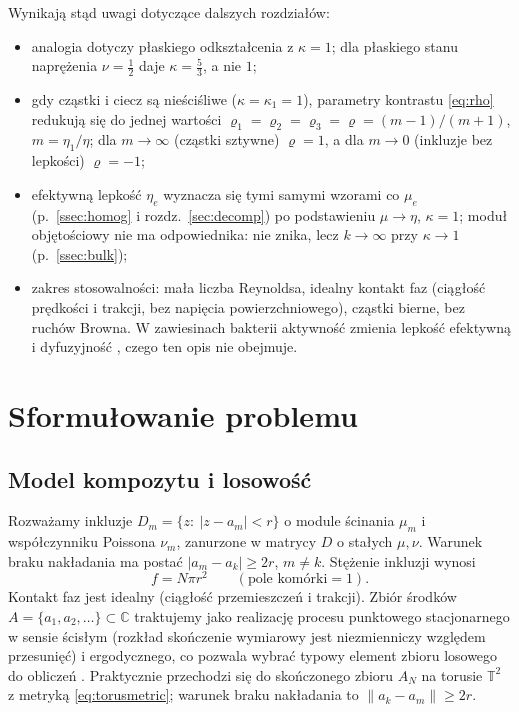 \documentclass[12pt,a4paper,twoside,openright]{report}
\theoremstyle{definition}
\theoremstyle{remark}
\newcommand{\C}{\mathbb{C}}
\newcommand{\T}{\mathbb{T}}
\begin{document}
Wynikają stąd uwagi dotyczące dalszych rozdziałów:
\begin{itemize}[nosep]
\item analogia dotyczy płaskiego odkształcenia z $\kappa=1$; dla płaskiego stanu naprężenia $\nu=\tfrac12$ daje $\kappa=\tfrac53$, a nie $1$;
\item gdy cząstki i ciecz są nieściśliwe ($\kappa=\kappa_1=1$), parametry kontrastu \eqref{eq:rho} redukują się do jednej wartości $\varrho_1=\varrho_2=\varrho_3=\varrho=(m-1)/(m+1)$, $m=\eta_1/\eta$; dla $m\to\infty$ (cząstki sztywne) $\varrho=1$, a dla $m\to0$ (inkluzje bez lepkości) $\varrho=-1$;
\item efektywną lepkość $\eta_e$ wyznacza się tymi samymi wzorami co $\mu_e$ (p.~\ref{ssec:homog} i rozdz.~\ref{sec:decomp}) po podstawieniu $\mu\to\eta$, $\kappa=1$; moduł objętościowy nie ma odpowiednika: nie znika, lecz $k\to\infty$ przy $\kappa\to1$ (p.~\ref{ssec:bulk});
\item zakres stosowalności: mała liczba Reynoldsa, idealny kontakt faz (ciągłość prędkości i trakcji, bez napięcia powierzchniowego), cząstki bierne, bez ruchów Browna. W zawiesinach bakterii aktywność zmienia lepkość efektywną i dyfuzyjność \cite{aranson2022bacterial}, czego ten opis nie obejmuje.
\end{itemize}


\chapter{Sformułowanie problemu}\label{sec:model}

\section{Model kompozytu i losowość}\label{ssec:modellos}

Rozważamy inkluzje $D_m=\{z:\ |z-a_m|<r\}$ o module ścinania $\mu_m$ i współczynniku Poissona $\nu_m$, zanurzone w matrycy $D$ o stałych $\mu,\nu$. Warunek braku nakładania ma postać $|a_m-a_k|\ge 2r$, $m\ne k$. Stężenie inkluzji wynosi
\begin{equation}
f=N\pi r^2\qquad(\text{pole komórki}=1).
\end{equation}
Kontakt faz jest idealny (ciągłość przemieszczeń i trakcji). Zbiór środków $A=\{a_1,a_2,\dots\}\subset\C$ traktujemy jako realizację procesu punktowego stacjonarnego w sensie ścisłym (rozkład skończenie wymiarowy jest niezmienniczy względem przesunięć) i ergodycznego, co pozwala wybrać typowy element zbioru losowego do obliczeń \cite{czapla2025computational}. Praktycznie przechodzi się do skończonego zbioru $A_N$ na torusie $\T^2$ z metryką \eqref{eq:torusmetric}; warunek braku nakładania to $\|a_k-a_m\|\ge2r$.
\end{document}
